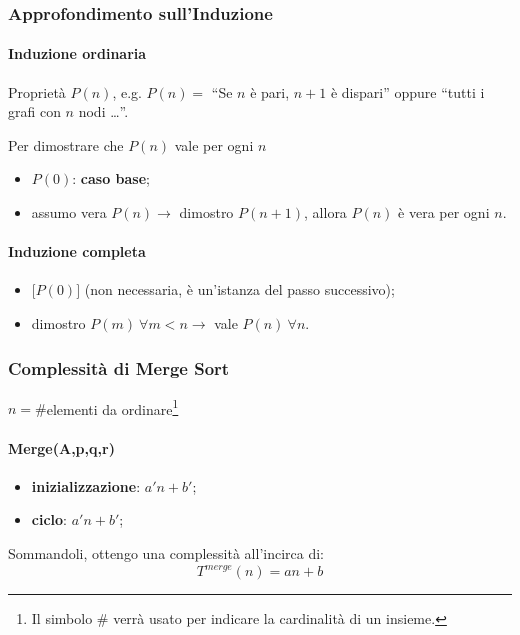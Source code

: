 \subsubsection{Approfondimento sull'Induzione}
\paragraph{Induzione ordinaria} 
Proprietà $P(n)$, e.g.  $P(n) = $ ``Se $n$ è pari, $n+1$ è dispari'' oppure 
``tutti i grafi con $n$ nodi \dots ''.\par
Per dimostrare che $P(n)$ vale per ogni $n$
\begin{itemize}
	\item $P(0)$: \textbf{caso base};
	\item assumo vera $P(n) \rightarrow $ dimostro $P(n+1)$, allora $P(n)$
	è vera per ogni $n$.
\end{itemize}

\paragraph{Induzione completa}
\begin{itemize}
	\item $\big[ P(0) \big]$ (non necessaria, è un'istanza del passo successivo);
	\item dimostro $P(m) \ \forall m<n \rightarrow $ vale $P(n) \ \forall n$.  
\end{itemize}

\subsubsection{Complessità di Merge Sort}

$n = \#$elementi da ordinare\footnote{Il simbolo \# verrà usato per indicare la cardinalità di un insieme.}

\paragraph{Merge(A,p,q,r)}
\begin{itemize}
	\item[] \textbf{inizializzazione}: $a'n+b'$;
	\item[] \textbf{ciclo}: $a'n+b'$;
\end{itemize}

Sommandoli, ottengo una complessità all'incirca di:
\begin{displaymath}
	T^{merge}(n) = an+b
\end{displaymath}

